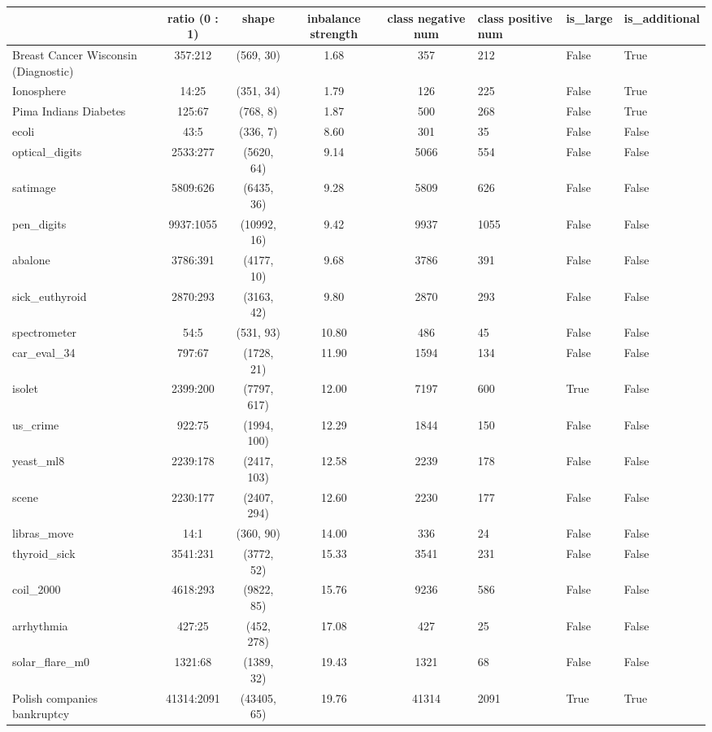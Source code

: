 \begin{tabular}{lcccc}
\toprule
 & ratio (0 : 1) & shape & inbalance strength & class negative num & class positive num & is_large & is_additional \\
\midrule
Breast Cancer Wisconsin (Diagnostic) & 357:212 & (569, 30) & 1.68 & 357 & 212 & False & True \\
Ionosphere & 14:25 & (351, 34) & 1.79 & 126 & 225 & False & True \\
Pima Indians Diabetes & 125:67 & (768, 8) & 1.87 & 500 & 268 & False & True \\
ecoli & 43:5 & (336, 7) & 8.60 & 301 & 35 & False & False \\
optical_digits & 2533:277 & (5620, 64) & 9.14 & 5066 & 554 & False & False \\
satimage & 5809:626 & (6435, 36) & 9.28 & 5809 & 626 & False & False \\
pen_digits & 9937:1055 & (10992, 16) & 9.42 & 9937 & 1055 & False & False \\
abalone & 3786:391 & (4177, 10) & 9.68 & 3786 & 391 & False & False \\
sick_euthyroid & 2870:293 & (3163, 42) & 9.80 & 2870 & 293 & False & False \\
spectrometer & 54:5 & (531, 93) & 10.80 & 486 & 45 & False & False \\
car_eval_34 & 797:67 & (1728, 21) & 11.90 & 1594 & 134 & False & False \\
isolet & 2399:200 & (7797, 617) & 12.00 & 7197 & 600 & True & False \\
us_crime & 922:75 & (1994, 100) & 12.29 & 1844 & 150 & False & False \\
yeast_ml8 & 2239:178 & (2417, 103) & 12.58 & 2239 & 178 & False & False \\
scene & 2230:177 & (2407, 294) & 12.60 & 2230 & 177 & False & False \\
libras_move & 14:1 & (360, 90) & 14.00 & 336 & 24 & False & False \\
thyroid_sick & 3541:231 & (3772, 52) & 15.33 & 3541 & 231 & False & False \\
coil_2000 & 4618:293 & (9822, 85) & 15.76 & 9236 & 586 & False & False \\
arrhythmia & 427:25 & (452, 278) & 17.08 & 427 & 25 & False & False \\
solar_flare_m0 & 1321:68 & (1389, 32) & 19.43 & 1321 & 68 & False & False \\
Polish companies bankruptcy & 41314:2091 & (43405, 65) & 19.76 & 41314 & 2091 & True & True \\

\end{tabular}

